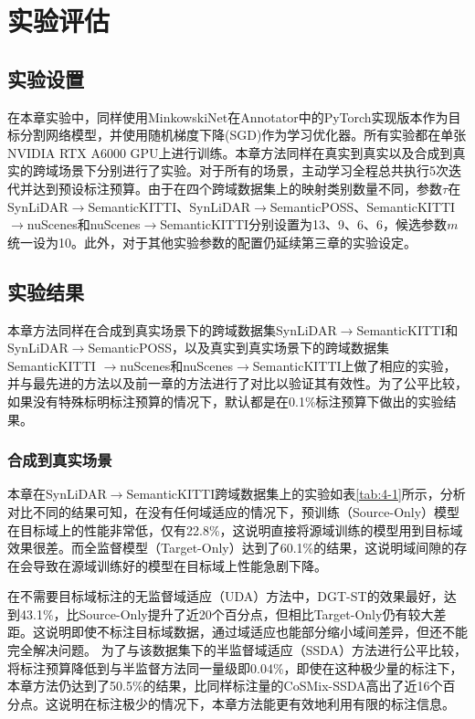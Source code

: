    \section{实验评估}
    \subsection{实验设置}
    在本章实验中，同样使用MinkowskiNet在Annotator中的PyTorch实现版本作为目标分割网络模型，并使用随机梯度下降(SGD)作为学习优化器。所有实验都在单张NVIDIA RTX A6000 GPU上进行训练。本章方法同样在真实到真实以及合成到真实的跨域场景下分别进行了实验。对于所有的场景，主动学习全程总共执行5次迭代并达到预设标注预算。由于在四个跨域数据集上的映射类别数量不同，参数$\tau$在SynLiDAR$\to$SemanticKITTI、SynLiDAR$\to$SemanticPOSS、SemanticKITTI$\to$nuScenes和nuScenes$\to$SemanticKITTI分别设置为13、9、6、6，候选参数$m$统一设为10。此外，对于其他实验参数的配置仍延续第三章的实验设定。
    \subsection{实验结果}
    本章方法同样在合成到真实场景下的跨域数据集SynLiDAR$\to$SemanticKITTI和SynLiDAR$\to$SemanticPOSS，以及真实到真实场景下的跨域数据集SemanticKITTI
    $\to$nuScenes和nuScenes$\to$SemanticKITTI上做了相应的实验，并与最先进的方法以及前一章的方法进行了对比以验证其有效性。为了公平比较，如果没有特殊标明标注预算的情况下，默认都是在0.1\%标注预算下做出的实验结果。
    \subsubsection{合成到真实场景}
    
    \vspace{-0.2cm}
    本章在SynLiDAR$\to$SemanticKITTI跨域数据集上的实验如表\ref{tab:4-1}所示，分析对比不同的结果可知，在没有任何域适应的情况下，预训练（Source-Only）模型在目标域上的性能非常低，仅有22.8\%，这说明直接将源域训练的模型用到目标域效果很差。而全监督模型（Target-Only）达到了60.1\%的结果，这说明域间隙的存在会导致在源域训练好的模型在目标域上性能急剧下降。

    在不需要目标域标注的无监督域适应（UDA）方法中，DGT-ST的效果最好，达到43.1\%，比Source-Only提升了近20个百分点，但相比Target-Only仍有较大差距。这说明即使不标注目标域数据，通过域适应也能部分缩小域间差异，但还不能完全解决问题。
    为了与该数据集下的半监督域适应（SSDA）方法进行公平比较，将标注预算降低到与半监督方法同一量级即0.04\%，即使在这种极少量的标注下，本章方法仍达到了50.5\%的结果，比同样标注量的CoSMix-SSDA高出了近16个百分点。这说明在标注极少的情况下，本章方法能更有效地利用有限的标注信息。

